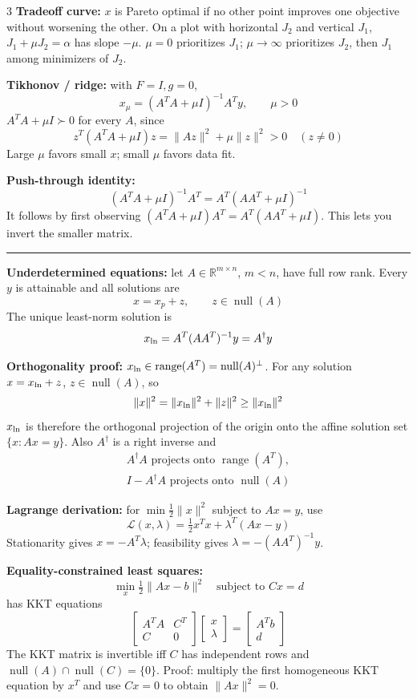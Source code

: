 \documentclass[10pt]{article}
\newcommand{\sect}[1]{\vspace{0.9pt}{\fontsize{7.2}{7.5}\selectfont\textbf{#1}}\vspace{0.25pt}\hrule\vspace{0.8pt}}
\newcommand{\sub}[1]{\textbf{#1}}
\newcommand{\R}{\mathbb{R}}
\newcommand{\C}{\mathbb{C}}
\newcommand{\range}{\operatorname{range}}
\newcommand{\nullsp}{\operatorname{null}}
\begin{document}
\begin{multicols*}{3}
\sub{Tradeoff curve:} \(x\) is Pareto optimal if no other point improves
one objective without worsening the other. On a plot with horizontal
\(J_2\) and vertical \(J_1\), \(J_1+\mu J_2=\alpha\) has slope \(-\mu\).
\(\mu=0\) prioritizes \(J_1\); \(\mu\to\infty\) prioritizes \(J_2\), then
\(J_1\) among minimizers of \(J_2\).

\sub{Tikhonov / ridge:} with \(F=I,g=0\),
\[
x_\mu=(A^TA+\mu I)^{-1}A^Ty,\qquad \mu>0
\]
\(A^TA+\mu I\succ0\) for every \(A\), since
\[
z^T(A^TA+\mu I)z=\|Az\|^2+\mu\|z\|^2>0\quad(z\ne0)
\]
Large \(\mu\) favors small \(x\); small \(\mu\) favors data fit.

\sub{Push-through identity:}
\[
(A^TA+\mu I)^{-1}A^T=A^T(AA^T+\mu I)^{-1}
\]
It follows by first observing
\((A^TA+\mu I)A^T=A^T(AA^T+\mu I)\). This lets you invert the smaller
matrix.

\sect{Least-Norm Solutions (Lecture 12)}
\sub{Underdetermined equations:} let \(A\in\R^{m\times n}\), \(m<n\),
have full row rank. Every \(y\) is attainable and all solutions are
\[
x=x_p+z,\qquad z\in\nullsp(A)
\]
The unique least-norm solution is
\[
x_{\rm ln}=A^T(AA^T)^{-1}y=A^\dagger y
\]

\sub{Orthogonality proof:} \(x_{\rm ln}\in\range(A^T)=\nullsp(A)^\perp\).
For any solution \(x=x_{\rm ln}+z\), \(z\in\nullsp(A)\), so
\[
\|x\|^2=\|x_{\rm ln}\|^2+\|z\|^2\ge\|x_{\rm ln}\|^2
\]
\(x_{\rm ln}\) is therefore the orthogonal projection of the origin onto
the affine solution set \(\{x:Ax=y\}\).
Also \(A^\dagger\) is a right inverse and
\[
\begin{gathered}
A^\dagger A\text{ projects onto }\range(A^T),\\
I-A^\dagger A\text{ projects onto }\nullsp(A)
\end{gathered}
\]

\sub{Lagrange derivation:} for
\(\min\frac12\|x\|^2\) subject to \(Ax=y\), use
\[
\mathcal L(x,\lambda)=\tfrac12x^Tx+\lambda^T(Ax-y)
\]
Stationarity gives \(x=-A^T\lambda\); feasibility gives
\(\lambda=-(AA^T)^{-1}y\).

\sub{Equality-constrained least squares:}
\[
\min_x\tfrac12\|Ax-b\|^2\quad\text{subject to }Cx=d
\]
has KKT equations
\[
\begin{bmatrix}A^TA&C^T\\C&0\end{bmatrix}
\begin{bmatrix}x\\\lambda\end{bmatrix}
=
\begin{bmatrix}A^Tb\\d\end{bmatrix}
\]
The KKT matrix is invertible iff \(C\) has independent rows and
\(\nullsp(A)\cap\nullsp(C)=\{0\}\). Proof: multiply the first homogeneous
KKT equation by \(x^T\) and use \(Cx=0\) to obtain \(\|Ax\|^2=0\).


\end{multicols*}
\end{document}
